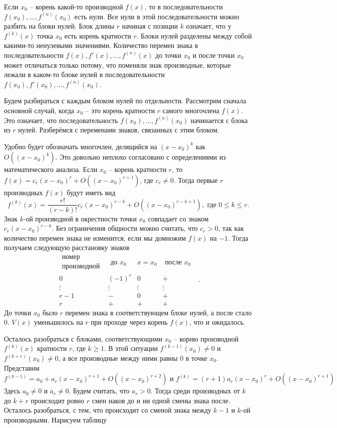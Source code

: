 Если $x_0$ -- корень какой-то производной $f(x)$, то в последовательности $f(x_0),\dots,f^{(n)}(x_0)$ есть нули. Все нули в этой последовательности можно разбить на блоки нулей. Блок длины $r$ начиная с позиции $k$ означает, что у $f^{(k)}(x)$ точка $x_0$ есть корень кратности $r$. Блоки нулей разделены между собой какими-то ненулевыми значениями. Количество перемен знака в последовательности $f(x),f'(x),\dots, f^{(n)}(x)$ до точки $x_0$ и после точки $x_0$ может отличаться только потому, что поменяли знак производные, которые лежали в каком-то блоке нулей в последовательности $f(x_0),f'(x_0),\dots, f^{(n)}(x_0)$. 

Будем разбираться с каждым блоком нулей по отдельности. Рассмотрим сначала основной случай, когда $x_0$ -- это корень кратности $r$ самого многочлена $f(x)$. Это означает, что последовательность $f(x_0), \dots, f^{(n)}(x_0)$ начинается с блока из $r$ нулей. Разберёмся с переменами знаков, связанных с этим блоком.

Удобно будет обозначать многочлен, делящийся на $(x-x_0)^k$ как $O((x-x_0)^k)$. Это довольно неплохо согласовано с определениями из математического анализа. Если $x_0$ -- корень кратности $r$, то  $f(x)=c_r(x-x_0)^r + O((x-x_0)^{r+1})$, где $c_r\neq 0$.  Тогда первые $r$ производных $f(x)$ будут иметь вид $$f^{(k)}(x)= \frac{r!}{(r-k)!}c_r(x-x_0)^{r-k}+O((x-x_0)^{r-k+1}), \text{ где } 0\leq k\leq r.$$ 
Знак $k$-ой производной в окрестности точки $x_0$ совпадает со знаком $c_r(x-x_0)^{r-k}$. Без ограничения общности можно считать, что $c_r>0$, так как количество перемен знака не изменится, если мы домножим $f(x)$ на $-1$. Тогда получаем следующую расстановку знаков
$$\begin{array}{c|c|c|c}
 \substack{\text{номер}\\ \text{производной} } &\text{ до $x_0$ }& x=x_0 & \text{ после $x_0$ }\\
\hline
0 & (-1)^r & 0 & +\\
\hline
\vdots & \vdots & \vdots & \vdots \\
\hline
r-1 & - & 0 & +\\
r & + & + & +
\end{array}.$$
До точки $x_0$ было $r$ перемен знака в соответствующем блоке нулей, а после стало $0$. $V(x)$ уменьшилось на $r$ при проходе через корень $f(x)$, что и ожидалось.

Осталось разобраться с блоками, соответствующими $x_0$ -- корню производной  $f^{(k)}(x)$ кратности $r$, где $k\geq 1$. В этой ситуации $f^{(k-1)}(x_0)\neq 0$ и $f^{(k+r)}(x_0)\neq 0$, а все производные между ними равны 0 в точке $x_0$. Представим 
$$f^{(k-1)}= a_0+ a_r(x-x_0)^{r+1}+O((x-x_0)^{r+2}) \text{ и } f^{(k)}=(r+1)a_r(x-x_0)^r+O((x-x_0)^{r+1})$$
Здесь $a_0\neq 0$  и $a_r \neq 0$. Будем считать, что $a_r>0$. Тогда среди производных от $k$ до $k+r$ происходит ровно $r$ смен наков до  и ни одной смены знака после. Осталось разобраться, с тем, что происходит со сменой знака между $k-1$ и $k$-ой производными. Нарисуем таблицу   

